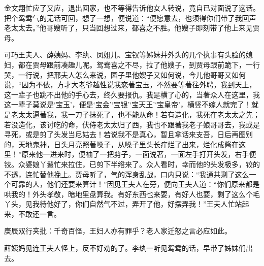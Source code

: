 \begin{parag}
    金文翔忙应了又应，退出回家，也不等得告诉他女人转说，竟自已对面说了这话。把个鸳鸯气的无话可回，想了一想，便说道：“便愿意去，也须得你们带了我回声老太太去。”他哥嫂听了，只当回想过来，都喜之不胜。他嫂子即刻带了他上来见贾母。
\end{parag}


\begin{parag}
    可巧王夫人、薛姨妈、李纨、凤姐儿、宝钗等姊妹并外头的几个执事有头脸的媳妇，都在贾母跟前凑趣儿呢。鸳鸯喜之不尽，拉了他嫂子，到贾母跟前跪下，一行哭，一行说，把邢夫人怎么来说，园子里他嫂子又如何说，今儿他哥哥又如何说，“因为不依，方才大老爷越性说我恋著宝玉，不然要等著往外聘，我到天上，这一辈子也跳不出他的手心去，终久要报仇。我是横了心的，当著众人在这里，我这一辈子莫说是‘宝玉’，便是‘宝金’‘宝银’‘宝天王’‘宝皇帝’，横竖不嫁人就完了！就是老太太逼著我，我一刀子抹死了，也不能从命！若有造化，我死在老太太之先；若没造化，该讨吃的命，伏侍老太太归了西，我也不跟著我老子娘哥哥去，我或是寻死，或是剪了头发当尼姑去！若说我不是真心，暂且拿话来支吾，日后再图别的，天地鬼神，日头月亮照著嗓子，从嗓子里头长疔烂了出来，烂化成酱在这里！”原来他一进来时，便袖了一把剪子，一面说著，一面左手打开头发，右手便铰。众婆娘丫鬟忙来拉住，已剪下半绺来了。众人看时，幸而他的头发极多，铰的不透，连忙替他挽上。贾母听了，气的浑身乱战，口内只说：“我通共剩了这么一个可靠的人，他们还要来算计！”因见王夫人在旁，便向王夫人道：“你们原来都是哄我的！外头孝敬，暗地里盘算我。有好东西也来要，有好人也要，剩了这么个毛丫头，见我待他好了，你们自然气不过，弄开了他，好摆弄我！”王夫人忙站起来，不敢还一言。\begin{note}庚辰双行夹批：千奇百怪，王妇人亦有罪乎？老人家迁怒之言必应如此。\end{note}薛姨妈见连王夫人怪上，反不好劝的了。李纨一听见鸳鸯的话，早带了姊妹们出去。
\end{parag}



